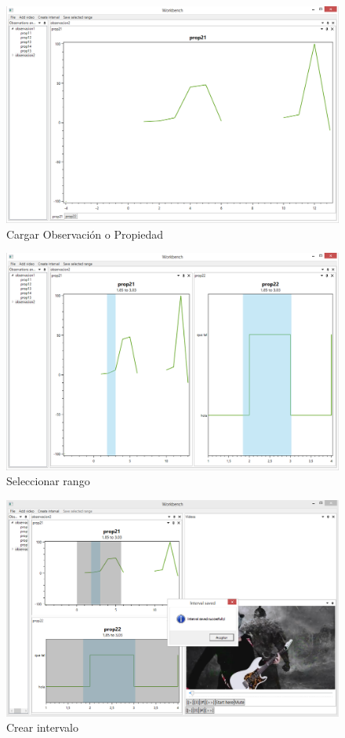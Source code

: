\begin{figure}[h]
\centering
\includegraphics[width=0.9\linewidth]{./Figures/Capturas/CargarObservacionPropiedad.PNG}
\caption{Cargar Observaci\'on o Propiedad}
\label{fig:CargarObservacionPropiedad}
\end{figure}

\begin{figure}[h]
\centering
\includegraphics[width=0.9\linewidth]{./Figures/Capturas/SeleccionRango.PNG}
\caption{Seleccionar rango}
\label{fig:SeleccionarRango}
\end{figure}

\begin{figure}[h]
\centering
\includegraphics[width=0.9\linewidth]{./Figures/Capturas/IntervaloCreado.PNG}
\caption{Crear intervalo}
\label{fig:CrearIntervalo}
\end{figure}

